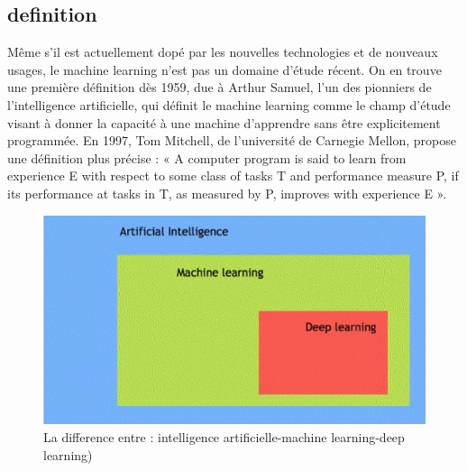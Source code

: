\documentclass[11pt]{report}
\begin{document}
\subsection{definition}
Même s’il est actuellement dopé par les nouvelles technologies et de nouveaux usages, le
machine learning n’est pas un domaine d’étude récent. On en trouve une première
définition dès 1959, due à Arthur Samuel, l’un des pionniers de l’intelligence artificielle,
qui définit le machine learning comme le champ d’étude visant à donner la capacité à une
machine d’apprendre sans être explicitement programmée. En 1997, Tom Mitchell, de
l’université de Carnegie Mellon, propose une définition plus précise :
« A computer program is said to learn from experience E with respect to some class of
tasks T and performance measure P, if its performance at tasks in T, as measured by P,
improves with experience E ».
\begin{figure}[H]
	\begin{center}
		\includegraphics[width=12cm]{images/artint.png}
		\caption{La difference entre : intelligence artificielle-machine learning-deep learning)}
		\label{fig:figure}
	\end{center}
\end{figure}
\end{document}
